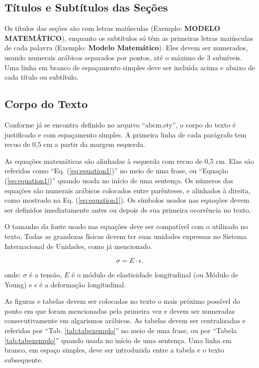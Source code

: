 \documentclass[10pt,fleqn,a4paper,twoside]{article}
\begin{document}
    \subsection{Títulos e Subtítulos das Seções }

        Os títulos das seções são com letras maiúsculas (Exemplo: \textbf{MODELO MATEMÁTICO}), enquanto os subtítulos só têm as primeiras letras maiúsculas de cada palavra (Exemplo: \textbf{Modelo Matemático}). Eles devem ser numerados, usando numerais arábicos separados por pontos, até o máximo de 3 subníveis. Uma linha em branco de espaçamento simples deve ser incluída acima e abaixo de cada título ou subtítulo.

    \subsection{Corpo do Texto}

        Conforme já se encontra definido no arquivo ``abcm.sty'', o corpo do texto é justificado e com espaçamento simples. A primeira linha de cada parágrafo tem recuo de 0,5 cm a partir da margem esquerda.

        As equações matemáticas são alinhadas à esquerda com recuo de 0,5 cm.  Elas são referidas como ``Eq. (\ref{eq:equation1})'' no meio de uma frase, ou ``Equação (\ref{eq:equation1})'' quando usada no início de uma sentença. Os números das equações são numerais arábicos colocados entre parênteses, e alinhados à direita, como mostrado na Eq. (\ref{eq:equation1}). Os símbolos usados nas equações devem ser definidos imediatamente antes ou depois de sua primeira ocorrência no texto.

        O tamanho da fonte usado nas equações deve ser compatível com o utilizado no texto. Todas as grandezas físicas devem ter suas unidades expressas no Sistema Internacional de Unidades, como já mencionado.

        \begin{equation}
        \sigma = E \cdot \epsilon. \label{eq:equation1}
        \end{equation}
    
    	\noindent
    	onde: $\sigma$ é a tensão, $E$ é o módulo de elasticidade longitudinal (ou Módulo de Young) e $\epsilon$ é a deformação longitudinal.

        As figuras e tabelas devem ser colocadas no texto o mais próximo possível do ponto em que foram mencionadas pela primeira vez e devem ser numeradas consecutivamente em algarismos arábicos. As tabelas devem ser centralizadas e referidas por ``Tab. \ref{tab:tabexemplo}'' no meio de uma frase, ou por ``Tabela \ref{tab:tabexemplo}'' quando usada no início de uma sentença. Uma linha em branco, em espaço simples, deve ser introduzida entre a tabela e o texto subsequente.
        
\end{document}
